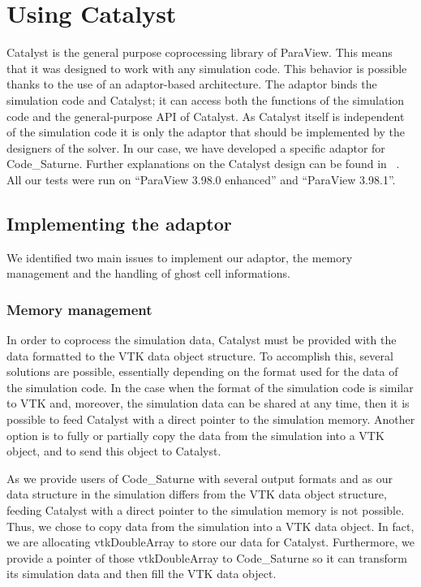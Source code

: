 \section{Using Catalyst}
\label{sec:catalyst}
Catalyst is the general purpose coprocessing library of ParaView. This means
that it was designed to work with any simulation code. This behavior is
possible thanks to the use of an adaptor-based architecture. The adaptor binds
the simulation code and Catalyst; it can access both the functions of the
simulation code and the general-purpose API of Catalyst. As Catalyst itself is
independent of the simulation code it is only the adaptor that should be
implemented by the designers of the solver. In our case, we have developed a specific adaptor for
Code\_Saturne. Further explanations on the Catalyst design can be found in
~\cite{6092322}.
All our tests were run on “ParaView 3.98.0 enhanced” and “ParaView 3.98.1”. 

\subsection{Implementing the adaptor}

We identified two main issues to implement our adaptor, the memory management and the handling of ghost cell informations. 

\subsubsection{Memory management}
In order to coprocess the simulation data, Catalyst must be provided with the
data formatted to the VTK data object structure. To accomplish this, several
solutions are possible, essentially depending on the format used for the data
of the simulation code. In the case when the format of the simulation code is
similar to VTK  and, moreover, the simulation data can be shared at any time,
then it is possible to feed Catalyst with a direct pointer to the simulation
memory. Another option is to fully or partially copy the data from the
simulation into a VTK object, and to send this object to Catalyst.

As we provide users of Code\_Saturne with several output formats and as our data
structure in the simulation differs from the VTK data object structure, feeding
Catalyst with a direct pointer to the simulation memory is not possible. Thus,
we chose to copy data from the simulation into a VTK data object. In fact, we
are allocating vtkDoubleArray to store our data for Catalyst. Furthermore, we
provide a pointer of those vtkDoubleArray to Code\_Saturne so it can transform
its simulation data and then fill the VTK data object.

